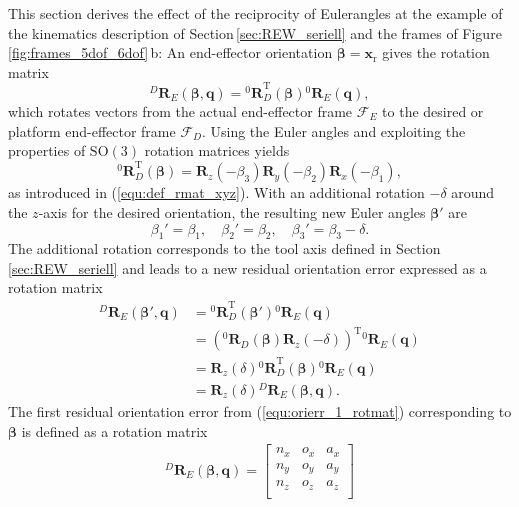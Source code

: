 \documentclass[robotics,article,accept,moreauthors,pdftex]{Definitions/mdpi}
\newcommand{\bm}[1]{\boldsymbol{#1}}
\newcommand{\rotmat}[2]{{{ }^{#1}\boldsymbol{R}}_{#2}}
\newcommand{\transp}[0]{{\mathrm{T}}}
\newcommand{\ks}[1]{{\mathcal{F}}_{#1}}
\begin{document}
This section derives the effect of the reciprocity of Euler\replaced[id=Sp]{ }{-}angles at the example of the kinematics description of Section\,\ref{sec:REW_seriell} and the frames of Figure\,\ref{fig:frames_5dof_6dof}\,b:
%
An end-effector orientation $\bm{\beta}=\bm{x}_{\mathrm{r}}$ gives the rotation matrix
%
\begin{equation}
\rotmat{D}{E}(\bm{\beta},\bm{q})
= 
\rotmat{0}{D}^\transp (\bm{\beta})\rotmat{0}{E}(\bm{q}),
\label{equ:orierr_1_rotmat}
\end{equation}
%
which rotates vectors from the actual end-effector frame $\ks{E}$ to the desired or platform end-effector frame $\ks{D}$.
Using the Euler angles and exploiting the properties of $\mathrm{SO(3)}$ rotation matrices yields
%
\begin{equation}
\rotmat{0}{D}^\transp(\bm{\beta})
=
\bm{R}_z(-\beta_3) \bm{R}_y(-\beta_2) \bm{R}_x(-\beta_1),
\end{equation}
%
as introduced in (\ref{equ:def_rmat_xyz}).
With an additional rotation $-\delta$ around the $z$-axis for the desired orientation, the resulting new Euler angles $\bm{\beta}'$ are
%
\begin{equation}
\beta_1'=\beta_1, \quad \beta_2'=\beta_2, \quad \beta_3'=\beta_3-\delta.
\end{equation}
%
The additional rotation corresponds to the tool axis defined in Section\,\ref{sec:REW_seriell} %
and leads to a new residual orientation error expressed as a rotation matrix
%
\begin{align}
    \rotmat{D}{E}(\bm{\beta}',\bm{q})
    &=
    \rotmat{0}{D}^\transp (\bm{\beta}') \rotmat{0}{E}(\bm{q}) \nonumber\\
    &=
    \left(\rotmat{0}{D}(\bm{\beta})\bm{R}_z(-\delta)\right)^\transp \rotmat{0}{E}(\bm{q}) \nonumber \\
    &=
    \bm{R}_z(\delta) \rotmat{0}{D}^\transp (\bm{\beta}) \rotmat{0}{E}(\bm{q}) \nonumber \\
    &=
    \bm{R}_z(\delta) \rotmat{D}{E}(\bm{\beta},\bm{q}).
    \label{equ:orierr_2_rotmat}
\end{align}
%
The first residual orientation error from (\ref{equ:orierr_1_rotmat}) corresponding to $\bm{\beta}$ is defined as a rotation matrix
%
\begin{align}
    \rotmat{D}{E}(\bm{\beta},\bm{q})
    =
    \begin{bmatrix}
        {n_x}&{o_x}&{a_x} \\
        {n_y}&{o_y}&{a_y} \\ 
        {n_z}&{o_z}&{a_z} \\ 
    \end{bmatrix}
    \label{equ:orierr_1_rotmat_def}
\end{align}
\end{document}
